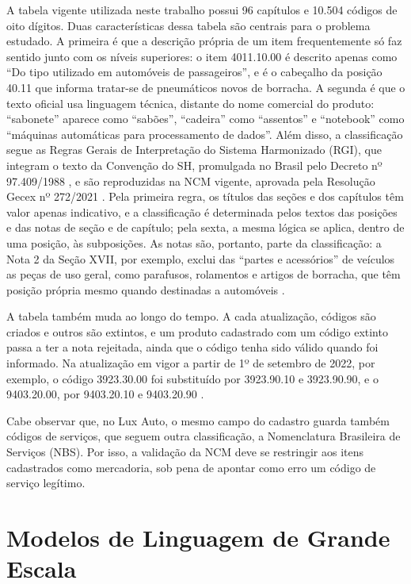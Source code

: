 A tabela vigente utilizada neste trabalho possui 96 capítulos e 10.504 códigos de oito dígitos. Duas características dessa tabela são centrais para o problema estudado. A primeira é que a descrição própria de um item frequentemente só faz sentido junto com os níveis superiores: o item 4011.10.00 é descrito apenas como ``Do tipo utilizado em automóveis de passageiros'', e é o cabeçalho da posição 40.11 que informa tratar-se de pneumáticos novos de borracha. A segunda é que o texto oficial usa linguagem técnica, distante do nome comercial do produto: ``sabonete'' aparece como ``sabões'', ``cadeira'' como ``assentos'' e ``notebook'' como ``máquinas automáticas para processamento de dados''. Além disso, a classificação segue as Regras Gerais de Interpretação do Sistema Harmonizado (RGI), que integram o texto da Convenção do SH, promulgada no Brasil pelo Decreto nº 97.409/1988 \cite{brasil1988sh}, e são reproduzidas na NCM vigente, aprovada pela Resolução Gecex nº 272/2021 \cite{gecex2021}. Pela primeira regra, os títulos das seções e dos capítulos têm valor apenas indicativo, e a classificação é determinada pelos textos das posições e das notas de seção e de capítulo; pela sexta, a mesma lógica se aplica, dentro de uma posição, às subposições. As notas são, portanto, parte da classificação: a Nota 2 da Seção XVII, por exemplo, exclui das ``partes e acessórios'' de veículos as peças de uso geral, como parafusos, rolamentos e artigos de borracha, que têm posição própria mesmo quando destinadas a automóveis \cite{gecex2021}.

A tabela também muda ao longo do tempo. A cada atualização, códigos são criados e outros são extintos, e um produto cadastrado com um código extinto passa a ter a nota rejeitada, ainda que o código tenha sido válido quando foi informado. Na atualização em vigor a partir de 1º de setembro de 2022, por exemplo, o código 3923.30.00 foi substituído por 3923.90.10 e 3923.90.90, e o 9403.20.00, por 9403.20.10 e 9403.20.90 \cite{encat2022nt}.

Cabe observar que, no Lux Auto, o mesmo campo do cadastro guarda também códigos de serviços, que seguem outra classificação, a Nomenclatura Brasileira de Serviços (NBS). Por isso, a validação da NCM deve se restringir aos itens cadastrados como mercadoria, sob pena de apontar como erro um código de serviço legítimo.

\section{Modelos de Linguagem de Grande Escala}

